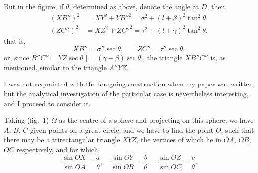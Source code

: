 \documentclass[11pt,a4paper]{article}
\theoremstyle{plain}
\theoremstyle{definition}
\theoremstyle{remark}
\begin{document}
But in the figure, if $\theta$, determined as above, denote the angle at $D$, then
\begin{align*}
(XB'')^2 &= XY^2 + YB''^2 = \sigma^2 + (l+\beta)^2\tan^2\theta,\\
(ZC'')^2 &= XZ^2 + ZC''^2 = \tau^2 + (l+\gamma)^2\tan^2\theta,
\end{align*}
that is,
\[
XB'' = \sigma''\sec\theta,\qquad ZC'' = \tau''\sec\theta,
\]
or, since $B''C'' = YZ\sec\theta$ [$= (\gamma-\beta)\sec\theta$], the triangle $XB''C''$ is, as mentioned, similar to the triangle $A''YZ$.

I was not acquainted with the foregoing construction when my paper was written; but the analytical investigation of the particular case is nevertheless interesting, and I proceed to consider it.

Taking (fig.~1) $\Omega$ as the centre of a sphere and projecting on this sphere, we have $A$, $B$, $C$ given points on a great circle; and we have to find the point $O$, such that there may be a trirectangular triangle $XYZ$, the vertices of which lie in $OA$, $OB$, $OC$ respectively, and for which
\[
\frac{\sin OX}{\sin OA} = \frac{a}{\theta},\quad \frac{\sin OY}{\sin OB} = \frac{b}{\theta},\quad \frac{\sin OZ}{\sin OC} = \frac{c}{\theta}.
\]
\end{document}
